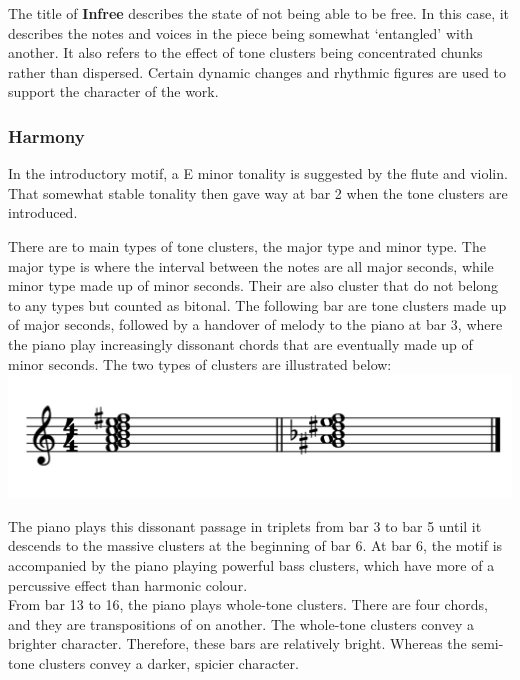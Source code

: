 \documentclass{article}
\begin{document}
The title of \textbf{Infree} describes the state of not being able to be free.
In this case, it describes the notes and voices in the piece being somewhat
`entangled' with another. It also refers to the effect of tone clusters being
concentrated chunks rather than dispersed. Certain dynamic changes and rhythmic
figures are used to support the character of the work.\\

\subsubsection{Harmony}

In the introductory motif, a E minor tonality is suggested by the flute and
violin.  That somewhat stable tonality then gave way at bar 2 when
the tone clusters are introduced.

There are to main types of tone clusters, the major type and minor type.  The
major type is where the interval between the notes are all major seconds, while
minor type made up of minor seconds. Their are also cluster that do not belong
to any types but counted as bitonal. The following bar are tone clusters made
up of major seconds, followed by a handover of melody to the piano at bar 3,
where the piano play increasingly dissonant chords that are eventually made up
of minor seconds. The two types of clusters are illustrated below:\\

\includegraphics[width=\textwidth]{e.png}

The piano plays this dissonant passage in triplets from bar 3 to bar 5 until it
descends to the massive clusters at the beginning of bar 6.  At bar 6, the
motif is accompanied by the piano playing powerful bass clusters, which have
more of a percussive effect than harmonic colour.\\

From bar 13 to 16, the piano plays whole-tone clusters. There are four chords,
and they are transpositions of on another. The whole-tone clusters convey a
brighter character. Therefore, these bars are relatively bright. Whereas
the semi-tone clusters convey a darker, spicier character.
\end{document}
